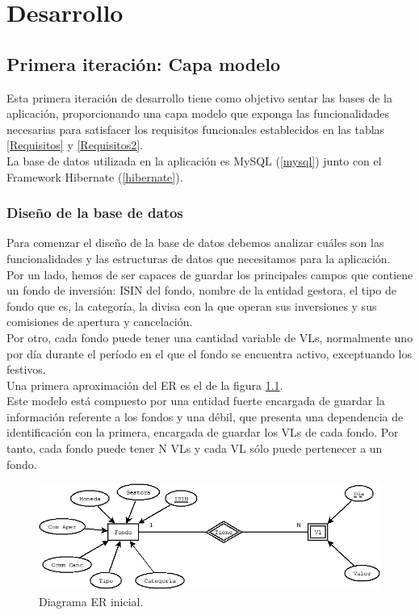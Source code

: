 \documentclass[12pt, a4paper]{book}
\begin{document}
\newpage
\chapter{Desarrollo}
\section{Primera iteración: Capa modelo}

Esta primera iteración de desarrollo tiene como objetivo sentar las bases de la aplicación, proporcionando una capa modelo que exponga las funcionalidades necesarias para satisfacer los requisitos funcionales establecidos en las tablas \ref{Requisitos} y \ref{Requisitos2}.\\

La base de datos utilizada en la aplicación es MySQL (\ref{mysql}) junto con el Framework Hibernate (\ref{hibernate}).

\subsection{Diseño de la base de datos}
Para comenzar el diseño de la base de datos debemos analizar cuáles son las funcionalidades y las estructuras de datos que necesitamos para la aplicación.\\

Por un lado, hemos de ser capaces de guardar los principales campos que contiene un fondo de inversión: \gls{ISIN} del fondo, nombre de la entidad gestora, el tipo de fondo que es, la categoría, la divisa con la que operan sus inversiones y sus comisiones de apertura y cancelación.\\

Por otro, cada fondo puede tener una cantidad variable de \gls{VL}s, normalmente uno por día durante el período en el que el fondo se encuentra activo, exceptuando los festivos.\\

Una primera aproximación del \gls{ER} es el de la figura \ref{fig:erinicial}.\\

Este modelo está compuesto por una entidad fuerte encargada de guardar la información referente a los fondos y una débil, que presenta una dependencia de identificación con la primera, encargada de guardar los \gls{VL}s de cada fondo. Por tanto, cada fondo puede tener N \gls{VL}s y cada \gls{VL} sólo puede pertenecer a un fondo.
\newpage

\begin{figure}[htbp]
	\centering
	\includegraphics[width=\textwidth]{figuras/ERSimple.png}
	\caption{Diagrama ER inicial.}
	\label{fig:erinicial}
\end {figure}
\end{document}
